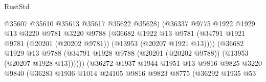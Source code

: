 \begin{lexlean}{RustStd}
\begin{coremodule}
                                          @35607
                                          @35610
                                          @35613
                                          @35617
                                          @35622
                                          @35628)
                                        (@36337
                                          @9775
                                          @1922
                                          @1929
                                          @13
                                          @3220
                                          @9781
                                          @3220
                                          @9788
                                          (@36682
                                            @1922
                                            @13
                                            @9781
                                            (@34791
                                              @1921
                                              @9781
                                              (@20201 (@20202 @9781))
                                              (@13953 (@20207 @1921 @13))))
                                          (@36682
                                            @1929
                                            @13
                                            @9788
                                            (@34791
                                              @1928
                                              @9788
                                              (@20201 (@20202 @9788))
                                              (@13953 (@20207 @1928 @13))))))
                                      (@36272
                                        @1937
                                        @1944
                                        @1951
                                        @13
                                        @9816
                                        @9825
                                        @3220
                                        @9840
                                        (@36283
                                          @1936
                                          @1014
                                          @24105
                                          @9816
                                          @9823
                                          @8775
                                          (@36292
                                            @1935
                                            @53

\end{coremodule}
\end{lexlean}
